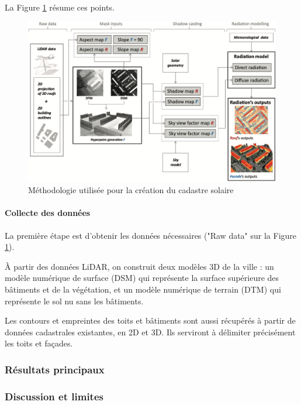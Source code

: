 {{{La Figure \ref{fig:cadastre_solaire_methodologie} résume ces points.
\begin{figure}[H]
    \centering
    \includegraphics[width=1\linewidth]{02-main//figures/cadastre_solaire_methodologie.png}
    \caption{Méthodologie utilisée pour la création du cadastre solaire \cite{desthieux_solar_2018}}
    \label{fig:cadastre_solaire_methodologie}
\end{figure}

\paragraph{Collecte des données}

\par{La première étape est d'obtenir les données nécessaires ("Raw data" sur la Figure \ref{fig:cadastre_solaire_methodologie}).}
\par{À partir des données LiDAR, on construit deux modèles 3D de la ville : un modèle numérique de surface (DSM) qui représente la surface supérieure des bâtiments et de la végétation, et un modèle numérique de terrain (DTM) qui représente le sol nu sans les bâtiments.}
\par{Les contours et empreintes des toits et bâtiments  sont aussi récupérés à partir de données cadastrales existantes, en 2D et 3D. Ils serviront à délimiter précisément les toits et façades.}

\subsubsection{Résultats principaux}

\subsubsection{Discussion et limites}

}}}
